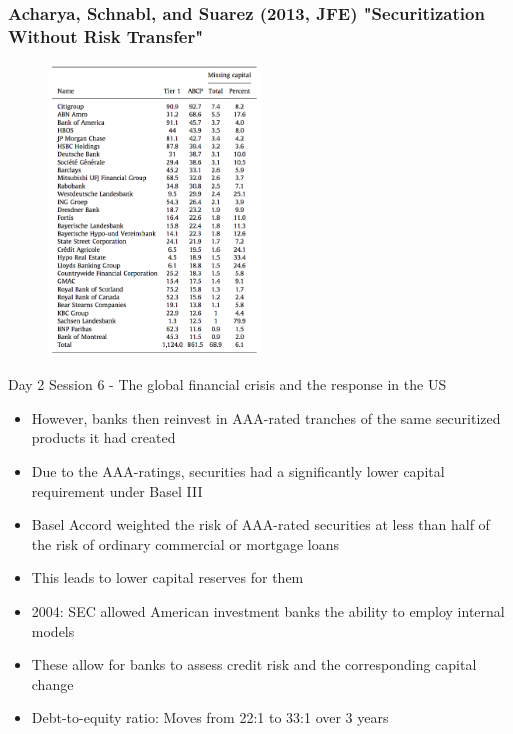 \documentclass[11pt]{beamer}
\begin{document}
\begin{frame}
	\frametitle{Acharya, Schnabl, and Suarez (2013, JFE) "Securitization Without Risk Transfer"}
    \begin{figure}
    	\begin{center}
    	\includegraphics[width=0.5\textwidth]{Figures/ASS2013_Table10.png}
        \end{center}
    \end{figure}
\end{frame}

\begin{frame}
	\begin{center}
    	{\Large Day 2 Session 6 - The global financial crisis and the response in the US}
    \end{center}
\end{frame}



\begin{frame}
\begin{itemize}
\item However, banks then reinvest in AAA-rated tranches of the same securitized products it had created
\item Due to the AAA-ratings, securities had a significantly lower capital requirement under Basel III
\item Basel Accord weighted the risk of AAA-rated securities at less than half of the risk of ordinary commercial or mortgage loans
\item This leads to lower capital reserves for them
\item 2004: SEC allowed American investment banks the ability to employ internal models
\item These allow for banks to assess credit risk and the corresponding capital change
\item Debt-to-equity ratio: Moves from 22:1 to 33:1 over 3 years
\end{itemize}
\end{frame}
\end{document}
